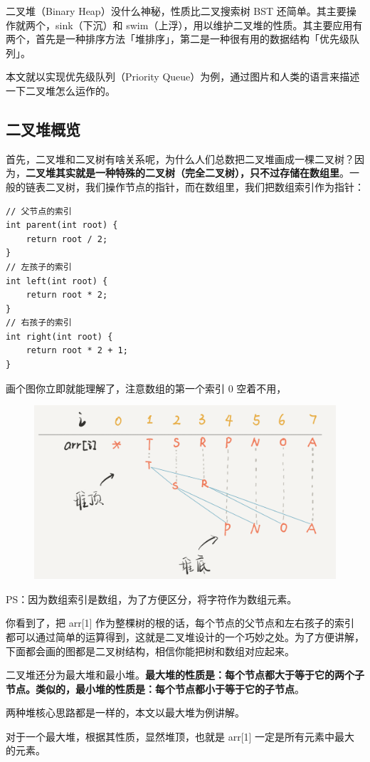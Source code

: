 \documentclass[12pt]{article}
\begin{document}
二叉堆（Binary Heap）没什么神秘，性质比二叉搜索树 BST 还简单。其主要操作就两个，sink（下沉）和 swim（上浮），用以维护二叉堆的性质。其主要应用有两个，首先是一种排序方法「堆排序」，第二是一种很有用的数据结构「优先级队列」。

本文就以实现优先级队列（Priority Queue）为例，通过图片和人类的语言来描述一下二叉堆怎么运作的。

\subsection{二叉堆概览}
首先，二叉堆和二叉树有啥关系呢，为什么人们总数把二叉堆画成一棵二叉树？因为，\textbf{二叉堆其实就是一种特殊的二叉树（完全二叉树），只不过存储在数组里}。一般的链表二叉树，我们操作节点的指针，而在数组里，我们把数组索引作为指针：
\begin{lstlisting}
// 父节点的索引
int parent(int root) {
    return root / 2;
}
// 左孩子的索引
int left(int root) {
    return root * 2;
}
// 右孩子的索引
int right(int root) {
    return root * 2 + 1;
}
\end{lstlisting}

画个图你立即就能理解了，注意数组的第一个索引 0 空着不用，
\begin{figure}[H]
    \centering
    \includegraphics[width=.6\textwidth]{fig/Binary_Heap_1.png}
\end{figure}
PS：因为数组索引是数组，为了方便区分，将字符作为数组元素。

你看到了，把 arr[1] 作为整棵树的根的话，每个节点的父节点和左右孩子的索引都可以通过简单的运算得到，这就是二叉堆设计的一个巧妙之处。为了方便讲解，下面都会画的图都是二叉树结构，相信你能把树和数组对应起来。

二叉堆还分为最大堆和最小堆。\textbf{最大堆的性质是：每个节点都大于等于它的两个子节点。类似的，最小堆的性质是：每个节点都小于等于它的子节点}。

两种堆核心思路都是一样的，本文以最大堆为例讲解。

对于一个最大堆，根据其性质，显然堆顶，也就是 arr[1] 一定是所有元素中最大的元素。
\end{document}
